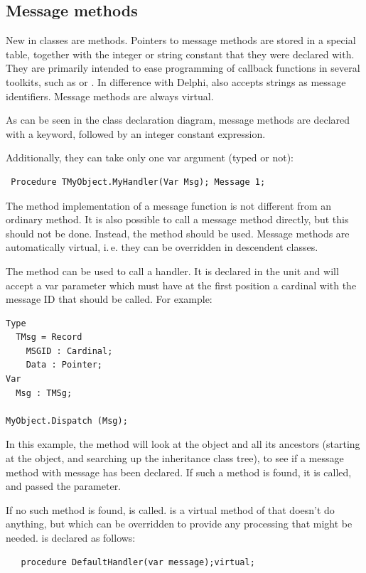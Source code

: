 \subsection{Message methods}
New in classes are  methods. Pointers to message methods are
stored in a special table, together with the integer or string constant that
they were declared with. They are primarily intended to ease programming of
callback functions in several  toolkits, such as  or
. In difference with Delphi, \fpc also accepts strings as message
identifiers. Message methods are always virtual.
 

As can be seen in the class declaration diagram, message methods are
declared with a  keyword, followed by an integer constant
expression.

Additionally, they can take only one var argument (typed or not):
\begin{verbatim}
 Procedure TMyObject.MyHandler(Var Msg); Message 1;
\end{verbatim}
The method implementation of a message function is not different from an
ordinary method. It is also possible to call a message method directly,
but this should not be done. Instead, the  method
should be used. Message methods are automatically virtual,
i.\,e. they can be overridden in descendent classes.

The  method can be used to call a
handler. It is declared in the  unit and will accept a var
parameter  which must have at the first position a cardinal with the
message ID that should be called. For example:
\begin{verbatim}
Type
  TMsg = Record
    MSGID : Cardinal;
    Data : Pointer;
Var
  Msg : TMSg;

MyObject.Dispatch (Msg);
\end{verbatim}
In this example, the  method will look at the object and all
its ancestors (starting at the object, and searching up the inheritance
class tree), to see if a message method with message  has been
declared. If such a method is found, it is called, and passed the
 parameter.

If no such method is found,  is called.
 is a virtual method of  that doesn't do
anything, but which can be overridden to provide any processing that might be
needed.  is declared as follows:
\begin{verbatim}
   procedure DefaultHandler(var message);virtual;
\end{verbatim}

